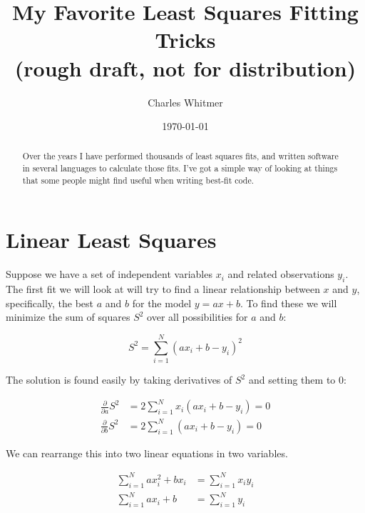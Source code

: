 \documentclass[letterpaper,12pt]{article}
\begin{document}
\title{My Favorite Least Squares Fitting Tricks \\ (rough draft, not for distribution)}
\author{Charles Whitmer}
\date{\today}
\maketitle

\begin{abstract}
Over the years I have performed thousands of least squares fits, and written software in several languages to calculate those fits. I've got a simple way of looking at things that some people might find useful when writing best-fit code.
\end{abstract}

\section{Linear Least Squares}
\label{sec.one}
Suppose we have a set of independent variables $x_i$ and related observations $y_i$. The first fit we will look at will try to find a linear relationship between $x$ and $y$, specifically, the best $a$ and $b$ for the model $y=ax+b$. To find these we will minimize the sum of squares $S^2$ over all possibilities for $a$ and $b$:

\begin{equation} \label{S.square}
S^2=\sum_{i=1}^N (a x_i + b - y_i)^2
\end{equation}

The solution is found easily by taking derivatives of $S^2$ and setting them to $0$:

\begin{equation}
\begin{aligned}
\frac{\partial}{\partial a}S^2&=2\sum_{i=1}^N x_i(a x_i+b-y_i)=0\\
\frac{\partial}{\partial b}S^2&=2\sum_{i=1}^N (a x_i+b-y_i)=0
\end{aligned}
\end{equation}

We can rearrange this into two linear equations in two variables.

\begin{equation}
\begin{aligned}
\label{linear1}
\sum_{i=1}^N a x_i^2+b x_i &= \sum_{i=1}^N x_i y_i\\
\sum_{i=1}^N a x_i+b &= \sum_{i=1}^N y_i
\end{aligned}
\end{equation}
\end{document}
